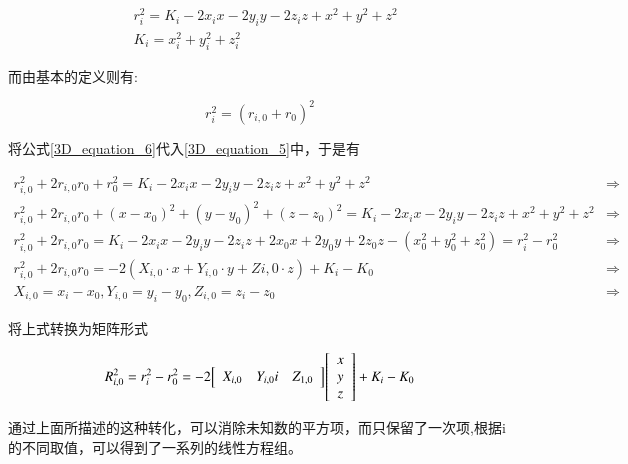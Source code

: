 \documentclass[winfonts,oneside]{njuthesis}
\begin{document}
		\begin{equation}  
		\begin{aligned}
		& r_i^2 = K_i - 2x_ix - 2y_iy - 2z_iz + x^2 + y^2 + z^2 \label{3D_equation_5}\\
		& K_i = x_i^2 + y_i^2 + z_i^2
		\end{aligned}
		\end{equation}
		
		而由基本的定义则有:
		
		\begin{equation}  
			r_i^2 = (r_{i,0}+r_0)^2 \label{3D_equation_6}
		\end{equation}
		
		将公式\ref{3D_equation_6}代入\ref{3D_equation_5}中，于是有
		
		\begin{equation}
		\begin{aligned}
			r_{i,0}^2 + 2r_{i,0}r_0 + r_0^2 = K_i - 2x_ix - 2y_iy - 2z_iz + x^2 + y^2 + z^2 & \Longrightarrow\\
			r_{i,0}^2 + 2r_{i,0}r_0 + (x-x_0)^2 + (y-y_0)^2 + (z-z_0)^2 = K_i - 2x_ix - 2y_iy - 2z_iz + x^2 + y^2 + z^2 & \Longrightarrow\\
			r_{i,0}^2 + 2r_{i,0}r_0 = K_i - 2x_ix - 2y_iy - 2z_iz + 2x_0x + 2y_0y + 2z_0z - (x_0^2 + y_0^2 + z_0^2) = r_i^2 - r_0^2 & \Longrightarrow\\
			r_{i,0}^2 + 2r_{i,0}r_0 = -2(X_{i,0}\cdot x + Y_{i,0}\cdot y + Z{i,0}\cdot z) + K_i - K_0 & \Longrightarrow\\
			X_{i,0} = x_i - x_0,  Y_{i,0} = y_i - y_0,  Z_{i,0} = z_i - z_0 & \Longrightarrow
		\end{aligned}
		\end{equation}
		
		将上式转换为矩阵形式
		
		\begin{equation}
			R_{i,0}^2 = r_i^2 - r_0^2 = -2{
			\left[ 
			\begin{array}{c c c}
				X_{i,0} & Y_{i,0} i & Z_{1,0}
			\end{array} 
			\right ]}{
			\left[ 
			\begin{array}{c}
				x\\
				y\\
				z
			\end{array}
			\right ]} + K_i - K_0
		\end{equation}
		
		通过上面所描述的这种转化，可以消除未知数的平方项，而只保留了一次项,根据i的不同取值，可以得到了一系列的线性方程组。
		
\end{document}
